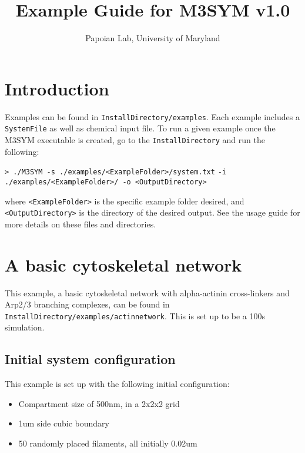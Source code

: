 \documentclass[11pt, oneside]{article}   	%
\title{Example Guide for M3SYM v1.0}
\author{Papoian Lab, University of Maryland}
\date{}							%
\begin{document}
\maketitle

\tableofcontents
\newpage

\section{Introduction}

Examples can be found in \texttt{InstallDirectory/examples}. Each example includes a \texttt{SystemFile} as well as chemical input file. To run a given example once the M3SYM executable is created, go to the \texttt{InstallDirectory} and run the following:\newline

\indent \texttt{> ./M3SYM -s ./examples/<ExampleFolder>/system.txt}\newline
\indent\indent \texttt{-i ./examples/<ExampleFolder>/  -o <OutputDirectory>}\newline

\noindent where \texttt{<ExampleFolder>} is the specific example folder desired, and \texttt{<OutputDirectory>} is the directory of the desired output. See the usage guide for more details on these files and directories.


\section{A basic cytoskeletal network}

This example, a basic cytoskeletal network with alpha-actinin cross-linkers and Arp2/3 branching complexes, can be found in
\texttt{InstallDirectory/examples/actinnetwork}. This is set up to be a 100s simulation.

\subsection{Initial system configuration}
 
 This example is set up with the following initial configuration:
 
 \begin{itemize}
 \item Compartment size of 500nm, in a 2x2x2 grid 
 \item 1um side cubic boundary
 \item 50 randomly placed filaments, all initially 0.02um
 \end{itemize}
\end{document}
